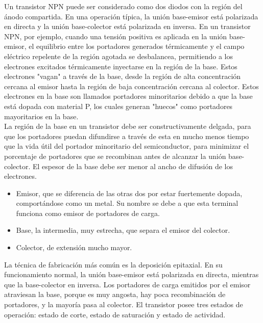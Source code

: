 \documentclass{article}
\begin{document}
Un transistor NPN puede ser considerado como dos diodos con la región del ánodo compartida. En una operación típica, la unión base-emisor está polarizada en directa y la unión base-colector está polarizada en inversa. En un transistor NPN, por ejemplo, cuando una tensión positiva es aplicada en la unión base-emisor, el equilibrio entre los portadores generados térmicamente y el campo eléctrico repelente de la región agotada se desbalancea, permitiendo a los electrones excitados térmicamente inyectarse en la región de la base. Estos electrones "vagan" a través de la base, desde la región de alta concentración cercana al emisor hasta la región de baja concentración cercana al colector. Estos electrones en la base son llamados portadores minoritarios debido a que la base está dopada con material P, los cuales generan "huecos" como portadores mayoritarios en la base.\citep{TBJwiki}\\

La región de la base en un transistor debe ser constructivamente delgada, para que los portadores puedan difundirse a través de esta en mucho menos tiempo que la vida útil del portador minoritario del semiconductor, para minimizar el porcentaje de portadores que se recombinan antes de alcanzar la unión base-colector. El espesor de la base debe ser menor al ancho de difusión de los electrones.\citep{TBJwiki}\\


\begin{itemize}
    \item  Emisor, que se diferencia de las otras dos por estar fuertemente dopada, comportándose como un metal. Su nombre se debe a que esta terminal funciona como emisor de portadores de carga.
       \item Base, la intermedia, muy estrecha, que separa el emisor del colector.
       \item Colector, de extensión mucho mayor.
\end{itemize}
   
La técnica de fabricación más común es la deposición epitaxial. En su funcionamiento normal, la unión base-emisor está polarizada en directa, mientras que la base-colector en inversa. Los portadores de carga emitidos por el emisor atraviesan la base, porque es muy angosta, hay poca recombinación de portadores, y la mayoría pasa al colector. El transistor posee tres estados de operación: estado de corte, estado de saturación y estado de actividad.\citep{TBJwiki}\\
\end{document}
